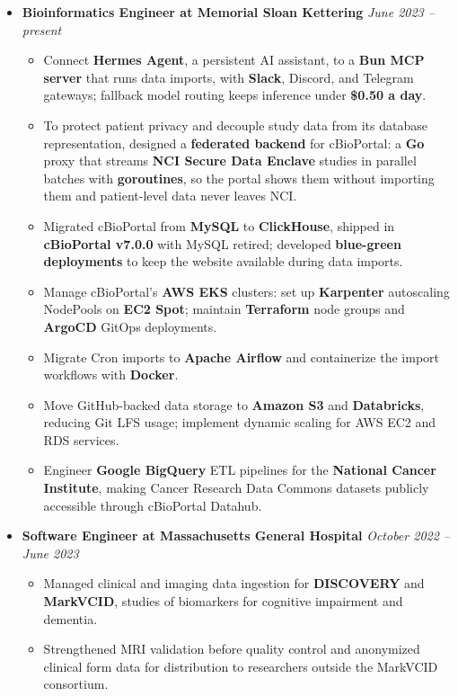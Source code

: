 \documentclass[11pt, letterpaper]{article}
\begin{document}
\begin{itemize}
  \item \textbf{Bioinformatics Engineer at Memorial Sloan Kettering} \hfill \textit{June 2023 -- present}
  \begin{itemize}
    \item Connect \textbf{Hermes Agent}, a persistent AI assistant, to a \textbf{Bun MCP server} that runs data imports, with \textbf{Slack}, Discord, and Telegram gateways; fallback model routing keeps inference under \textbf{\$0.50 a day}.
    \item To protect patient privacy and decouple study data from its database representation, designed a \textbf{federated backend} for cBioPortal: a \textbf{Go} proxy that streams \textbf{NCI Secure Data Enclave} studies in parallel batches with \textbf{goroutines}, so the portal shows them without importing them and patient-level data never leaves NCI.
    \item Migrated cBioPortal from \textbf{MySQL} to \textbf{ClickHouse}, shipped in \textbf{cBioPortal v7.0.0} with MySQL retired; developed \textbf{blue-green deployments} to keep the website available during data imports.
    \item Manage cBioPortal's \textbf{AWS EKS} clusters: set up \textbf{Karpenter} autoscaling NodePools on \textbf{EC2 Spot}; maintain \textbf{Terraform} node groups and \textbf{ArgoCD} GitOps deployments.
    \item Migrate Cron imports to \textbf{Apache Airflow} and containerize the import workflows with \textbf{Docker}.
    \item Move GitHub-backed data storage to \textbf{Amazon S3} and \textbf{Databricks}, reducing Git LFS usage; implement dynamic scaling for AWS EC2 and RDS services.
    \item Engineer \textbf{Google BigQuery} ETL pipelines for the \textbf{National Cancer Institute}, making Cancer Research Data Commons datasets publicly accessible through cBioPortal Datahub.
  \end{itemize}

  \newpage
  \item \textbf{Software Engineer at Massachusetts General Hospital} \hfill \textit{October 2022 -- June 2023}
  \begin{itemize}
    \item Managed clinical and imaging data ingestion for \textbf{DISCOVERY} and \textbf{MarkVCID}, studies of biomarkers for cognitive impairment and dementia.
    \item Strengthened MRI validation before quality control and anonymized clinical form data for distribution to researchers outside the MarkVCID consortium.
  \end{itemize}


\end{itemize}
\end{document}
